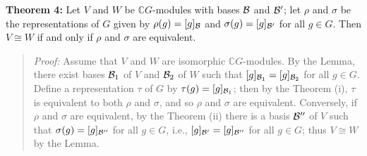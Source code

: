 {\bf Theorem 4:} Let $V$ and $W$ be ${\mathbb C}G$-modules with bases
${\cal B}$ and ${\cal B}'$; let $\rho$ and $\sigma$ be the representations of $G$ given by
$\rho(g)=[g]_{\cal B}$ and $\sigma(g)=[g]_{{\cal B}'}$ for all $g\in G$. Then $V\cong W$ if
and only if $\rho$ and $\sigma$ are equivalent.
\begin{quote}
\emph{Proof:}
Assume that $V$ and $W$ are isomorphic ${\mathbb C}G$-modules. By the Lemma,
there exist bases ${\cal B}_1$ of $V$ and ${\cal B}_2$ of $W$ such that
$[g]_{{\cal B}_1}=[g]_{{\cal B}_2}$ for all $g\in G$. Define a representation $\tau$ of
$G$ by $\tau(g)=[g]_{{\cal B}_1}$; then by the Theorem (i), $\tau$ is equivalent to
both $\rho$ and $\sigma$, and so $\rho$ and $\sigma$ are equivalent. Conversely,
if $\rho$ and $\sigma$ are equivalent, by the Theorem (ii) there is a basis
${\cal B}''$ of $V$ such that $\sigma(g)=[g]_{{\cal B}''}$ for all $g\in G$, i.e.,
$[g]_{{\cal B}'}=[g]_{{\cal B}''}$ for all $g\in G$; thus $V\cong W$ by the Lemma.
\end{quote}
